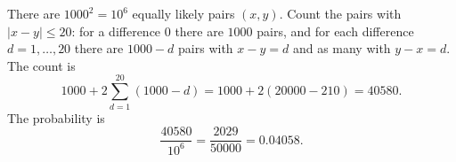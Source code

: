 There are $1000^2=10^6$ equally likely pairs $(x,y)$. Count the pairs with $|x-y|\le20$: for a difference $0$ there are $1000$ pairs, and for each difference $d=1,\dots,20$ there are $1000-d$ pairs with $x-y=d$ and as many with $y-x=d$. The count is
\[1000+2\sum_{d=1}^{20}(1000-d)=1000+2(20000-210)=40580.\]
The probability is
\[\dfrac{40580}{10^6}=\boxed{\dfrac{2029}{50000}}=0.04058.\]

